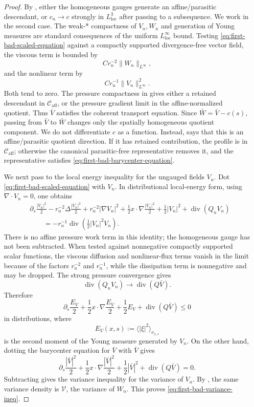 \documentclass[11pt]{amsart}
\numberwithin{equation}{section}
\theoremstyle{plain}
\theoremstyle{definition}
\theoremstyle{remark}
\newcommand{\loc}{\mathrm{loc}}
\newcommand{\divergence}{\operatorname{div}}
\newcommand{\Caff}{\mathcal C_{\mathrm{aff}}}
\begin{document}
\begin{proof}
By , either the homogeneous gauges
generate an affine/parasitic descendant, or \(c_n\to c\) strongly in
\(L^3_{\loc}\) after passing to a subsequence.  We work in the second case.
The weak-* compactness of \(V_n,W_n\) and generation of Young measures are
standard consequences of the uniform \(L^\infty_{\loc}\) bound.  Testing
\eqref{eq:first-bad-scaled-equation} against a compactly supported
divergence-free vector field, the viscous term is bounded by
\[
   Cr_n^{-2}\|W_n\|_{L^\infty},
\]
and the nonlinear term by
\[
   Cr_n^{-1}\|V_n\|_{L^\infty}^2.
\]
Both tend to zero.  The pressure compactness in
 gives either a retained descendant in
\(\Caff\), or the pressure gradient limit in the
affine-normalized quotient.
Thus \(\bar V\) satisfies the coherent transport equation.  Since
\(\bar W=\bar V-c(s)\), passing from \(\bar V\) to \(\bar W\) changes only the
spatially homogeneous quotient component.  We do not differentiate \(c\) as a
function.  Instead,  says that this is
an affine/parasitic quotient direction.  If it has retained contribution, the profile
is in \(\Caff\); otherwise the canonical parasitic-free representative removes
it, and the representative satisfies
\eqref{eq:first-bad-barycenter-equation}.

We next pass to the local energy inequality for the ungauged fields \(V_n\).
Dot \eqref{eq:first-bad-scaled-equation} with \(V_n\).  In distributional
local-energy form, using \(\nabla\cdot V_n=0\), one obtains
\[
\begin{aligned}
   &\partial_s\frac{|V_n|^2}{2}
   -r_n^{-2}\Delta\frac{|V_n|^2}{2}
   +r_n^{-2}|\nabla V_n|^2
   +\frac12x\cdot\nabla\frac{|V_n|^2}{2}
   +\frac12|V_n|^2
   +\divergence(Q_nV_n)                                      \\
   &\qquad
   =
   -r_n^{-1}\divergence\!\left(\frac12|V_n|^2V_n\right).
\end{aligned}
\]
There is no affine pressure work term in this identity; the homogeneous gauge
has not been subtracted.  When tested against nonnegative compactly supported
scalar functions, the viscous
diffusion and nonlinear-flux terms vanish in the limit because of the factors
\(r_n^{-2}\) and \(r_n^{-1}\), while the dissipation term is nonnegative and
may be dropped.  The strong pressure convergence gives
\[
   \divergence(Q_nV_n)\to\divergence(Q\bar V).
\]
Therefore
\[
   \partial_s\frac{E_V}{2}
   +\frac12x\cdot\nabla\frac{E_V}{2}
   +\frac12E_V
   +\divergence(Q\bar V)
   \le0
\]
in distributions, where
\[
   E_V(x,s):=\langle|\xi|^2\rangle_{\nu_{x,s}}
\]
is the second moment of the Young measure generated by \(V_n\).  On the other
hand, dotting the barycenter equation for \(\bar V\) with \(\bar V\) gives
\[
   \partial_s\frac{|\bar V|^2}{2}
   +\frac12x\cdot\nabla\frac{|\bar V|^2}{2}
   +\frac12|\bar V|^2
   +\divergence(Q\bar V)=0 .
\]
Subtracting gives the variance inequality for the variance of \(V_n\).  By
, the same variance density is
\(\mathcal V\), the variance of \(W_n\).  This proves
\eqref{eq:first-bad-variance-ineq}.
\end{proof}
\end{document}
